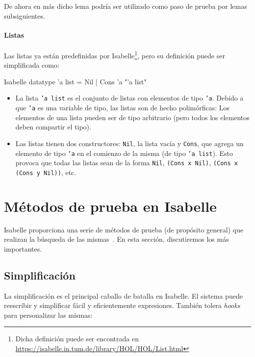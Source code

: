 \documentclass[12pt]{book}
\begin{document}
De ahora en más dicho lema podría ser utilizado como paso de prueba por lemas subsiguientes.

\paragraph{Listas}

Las listas ya están predefinidas por Isabelle\footnote{Dicha definición puede ser encontrada en \url{https://isabelle.in.tum.de/library/HOL/HOL/List.html}}, pero su definición puede ser simplificada como:

\begin{code}[title=Tipo de datos \textit{lista}.]{Isabelle}
datatype 'a list = Nil | Cons 'a "'a list"
\end{code}

\begin{itemize}
	\item La lista \texttt{'a list} es el conjunto de listas con elementos de tipo \texttt{'a}. Debido a que \texttt{'a} es una variable de tipo, las listas son de hecho polimórficas: Los elementos de una lista pueden ser de tipo arbitrario (pero todos los elementos deben compartir el tipo).

	\item Las listas tienen dos constructores: \texttt{Nil}, la lista vacía y \texttt{Cons}, que agrega un elemento de tipo \texttt{'a} en el comienzo de la misma (de tipo \texttt{'a list}). Esto provoca que todas las listas sean de la forma \texttt{Nil}, \texttt{(Cons x Nil)}, \texttt{(Cons x (Cons y Nil))}, etc.
\end{itemize}


\section{Métodos de prueba en Isabelle}

Isabelle proporciona una serie de métodos de prueba (de propósito general) que realizan la búsqueda de las mismas~\cite{proof_and_disproof}. En esta sección, discutiremos los más importantes.

\subsection{Simplificación}

La simplificación es el principal caballo de batalla en Isabelle. El sistema puede reescribir y simplificar fácil y eficientemente expresiones. También tolera \textit{hooks} para personalizar las mismas:
\end{document}
